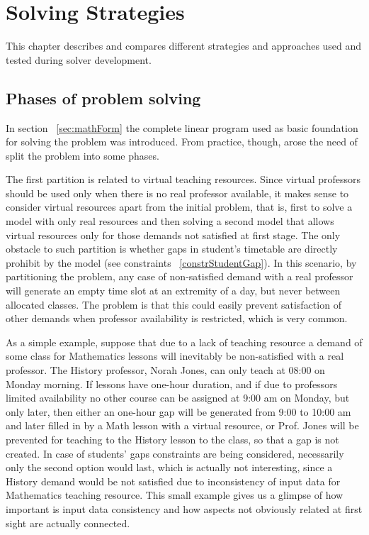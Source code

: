 \chapter{Solving Strategies}
\label{chap:strategies}

This chapter describes and compares different strategies and approaches used and tested during solver development.


\section{Phases of problem solving}

In section ~\ref{sec:mathForm} the complete linear program used as basic foundation for solving the problem was introduced. From practice, though, arose the need of split the problem into some phases.

The first partition is related to virtual teaching resources. Since virtual professors should be used only when there is no real professor available, it makes sense to consider virtual resources apart from the initial problem, that is, first to solve a model with only real resources and then solving a second model that allows virtual resources only for those demands not satisfied at first stage. The only obstacle to such partition is whether gaps in student's timetable are directly prohibit by the model (see constraints ~\ref{constrStudentGap}). In this scenario, by partitioning the problem, any case of non-satisfied demand with a real professor will generate an empty time slot at an extremity of a day, but never between allocated classes. The problem is that this could easily prevent satisfaction of other demands when professor availability is restricted, which is very common. 

As a simple example, suppose that due to a lack of teaching resource a demand of some class for Mathematics lessons will inevitably be non-satisfied with a real professor. The History professor, Norah Jones, can only teach at 08:00 on Monday morning. If lessons have one-hour duration, and if due to professors limited availability no other course can be assigned at 9:00 am on Monday, but only later, then either an one-hour gap will be generated from 9:00 to 10:00 am and later filled in by a Math lesson with a virtual resource, or Prof. Jones will be prevented for teaching to the History lesson to the class, so that a gap is not created. In case of students' gaps constraints are being considered, necessarily only the second option would last, which is actually not interesting, since a History demand would be not satisfied due to inconsistency of input data for Mathematics teaching resource. This small example gives us a glimpse of how important is input data consistency and how aspects not obviously related at first sight are actually connected.

